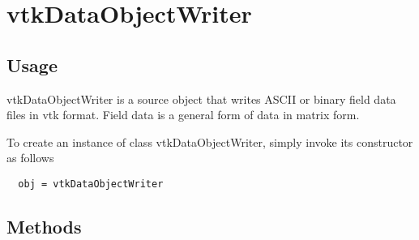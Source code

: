 \section{vtkDataObjectWriter}

\subsection{Usage}

 vtkDataObjectWriter is a source object that writes ASCII or binary 
 field data files in vtk format. Field data is a general form of data in
 matrix form.

To create an instance of class vtkDataObjectWriter, simply
invoke its constructor as follows
\begin{verbatim}
  obj = vtkDataObjectWriter
\end{verbatim}
\subsection{Methods}

